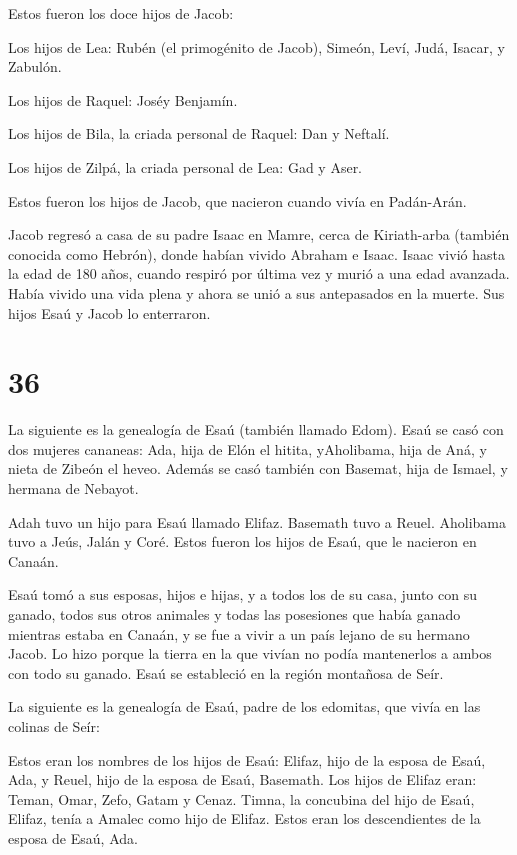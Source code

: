 Estos fueron los doce hijos de Jacob:

 Los hijos de Lea: Rubén (el primogénito de Jacob), Simeón,
Leví, Judá, Isacar, y Zabulón.

 Los hijos de Raquel: Joséy Benjamín.

 Los hijos de Bila, la criada personal de Raquel: Dan y
Neftalí.

 Los hijos de Zilpá, la criada personal de Lea: Gad y Aser.

Estos fueron los hijos de Jacob, que nacieron cuando vivía en
Padán-Arán.

 Jacob regresó a casa de su padre Isaac en Mamre, cerca de
Kiriath-arba (también conocida como Hebrón), donde habían vivido Abraham
e Isaac.  Isaac vivió hasta la edad de 180 años,
 cuando respiró por última vez y murió a una edad avanzada.
Había vivido una vida plena y ahora se unió a sus antepasados en la
muerte. Sus hijos Esaú y Jacob lo enterraron.

\hypertarget{section-35}{%
\section{36}\label{section-35}}

 La siguiente es la genealogía de Esaú (también llamado
Edom).  Esaú se casó con dos mujeres cananeas: Ada, hija de
Elón el hitita, yAholibama, hija de Aná, y nieta de Zibeón el heveo.
 Además se casó también con Basemat, hija de Ismael, y
hermana de Nebayot.

 Adah tuvo un hijo para Esaú llamado Elifaz. Basemath tuvo a
Reuel.  Aholibama tuvo a Jeús, Jalán y Coré. Estos fueron
los hijos de Esaú, que le nacieron en Canaán.

 Esaú tomó a sus esposas, hijos e hijas, y a todos los de su
casa, junto con su ganado, todos sus otros animales y todas las
posesiones que había ganado mientras estaba en Canaán, y se fue a vivir
a un país lejano de su hermano Jacob.  Lo hizo porque la
tierra en la que vivían no podía mantenerlos a ambos con todo su ganado.
 Esaú se estableció en la región montañosa de Seír.

 La siguiente es la genealogía de Esaú, padre de los
edomitas, que vivía en las colinas de Seír:

 Estos eran los nombres de los hijos de Esaú: Elifaz, hijo
de la esposa de Esaú, Ada, y Reuel, hijo de la esposa de Esaú, Basemath.
 Los hijos de Elifaz eran: Teman, Omar, Zefo, Gatam y
Cenaz.  Timna, la concubina del hijo de Esaú, Elifaz, tenía
a Amalec como hijo de Elifaz. Estos eran los descendientes de la esposa
de Esaú, Ada.

